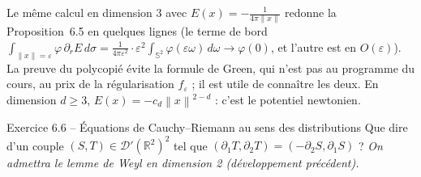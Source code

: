 \documentclass[11pt,a4paper]{article}
\newcommand{\R}{\mathbb{R}}
\newcommand{\norm}[1]{\left\|#1\right\|}
\newcommand{\D}{\mathcal{D}}
\theoremstyle{definition}
\begin{document}
\begin{commentaire}
Le même calcul en dimension $3$ avec $E(x)=-\frac1{4\pi\norm x}$ redonne la Proposition~6.5 en quelques lignes (le terme de bord $\int_{\norm x=\varepsilon}\varphi\,\partial_rE\,d\sigma=\frac1{4\pi\varepsilon^2}\cdot\varepsilon^2\int_{\mathbb S^2}\varphi(\varepsilon\omega)\,d\omega\to\varphi(0)$, et l'autre est en $O(\varepsilon)$). La preuve du polycopié évite la formule de Green, qui n'est pas au programme du cours, au prix de la régularisation $f_\varepsilon$ ; il est utile de connaître les deux. En dimension $d\ge3$, $E(x)=-c_d\norm x^{2-d}$ : c'est le potentiel newtonien.
\end{commentaire}

\begin{exo}{Exercice 6.6 -- Équations de Cauchy--Riemann au sens des distributions}
Que dire d'un couple $(S,T)\in\D'(\R^2)^2$ tel que $(\partial_1T,\partial_2T)=(-\partial_2S,\partial_1S)$ ? \emph{On admettra le lemme de Weyl en dimension 2 (développement précédent).}
\end{exo}
\end{document}
